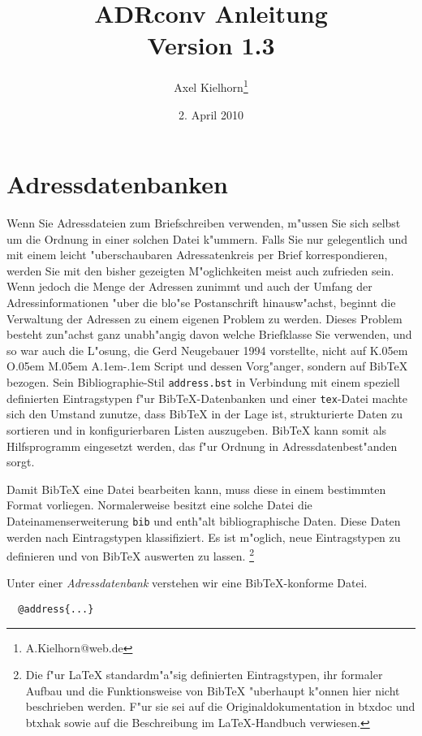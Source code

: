 \documentclass{article}
\title{ADRconv Anleitung\\Version 1.3}
\author{Axel Kielhorn\thanks{A.Kielhorn@web.de}}
\date{2. April 2010}
\newcommand*{\File}[1]{\texttt{#1}}
\DeclareRobustCommand{\KOMAScript}{\textsf{K\kern.05em O\kern.05em%
      M\kern.05em A\kern.1em-\kern.1em Script}}
\begin{document}
\maketitle

\section{Adressdatenbanken}\label{sec:adrconv.database}

Wenn Sie Adressdateien zum Briefschreiben verwenden, m"ussen Sie sich selbst
um die Ordnung in einer solchen Datei k"ummern. Falls Sie nur gelegentlich
und mit einem leicht "uberschaubaren Adressatenkreis per Brief
korrespondieren, werden Sie mit den bisher gezeigten M"oglichkeiten meist
auch zufrieden sein. Wenn jedoch die Menge der Adressen zunimmt und auch der
Umfang der Adressinformationen "uber die blo"se Postanschrift hinausw"achst,
beginnt die Verwaltung der Adressen zu einem eigenen Problem zu werden.
Dieses Problem besteht zun"achst ganz unabh"angig davon welche Briefklasse
Sie verwenden, und so war auch die L"osung, die Gerd Neugebauer 1994
vorstellte, nicht auf \KOMAScript{} und dessen Vorg"anger, sondern auf
Bib\TeX{} bezogen. Sein Bibliographie-Stil \File{address.bst} in Verbindung
mit einem speziell definierten Eintragstypen f"ur Bib\TeX-Datenbanken und
einer \File{tex}-Datei machte sich den Umstand zunutze, dass Bib\TeX{} in
der Lage ist, strukturierte Daten zu sortieren und in konfigurierbaren
Listen auszugeben. Bib\TeX{} kann somit als Hilfsprogramm eingesetzt werden,
das f"ur Ordnung in Adressdatenbest"anden sorgt.

Damit Bib\TeX{} eine Datei bearbeiten kann, muss diese in einem 
bestimmten Format vorliegen. Normalerweise besitzt eine solche Datei 
die Dateinamenserweiterung \File{bib} und enth"alt bibliographische 
Daten. Diese Daten werden nach Eintragstypen klassifiziert. Es ist 
m"oglich, neue Eintragstypen zu definieren und von Bib\TeX{} auswerten zu 
lassen.%
\footnote{Die f"ur \LaTeX{} standardm"a"sig definierten Eintragstypen,
ihr formaler Aufbau und die Funktionsweise von Bib\TeX{} "uberhaupt
k"onnen hier nicht beschrieben werden. F"ur sie sei auf die
Originaldokumentation in \textsf{btxdoc} und \textsf{btxhak}
sowie auf die Beschreibung im \LaTeX-Handbuch verwiesen.}

Unter einer \emph{Adressdatenbank} verstehen
wir eine Bib\TeX-konforme Datei.
\begin{verbatim}
  @address{...}
\end{verbatim}
\end{document}
